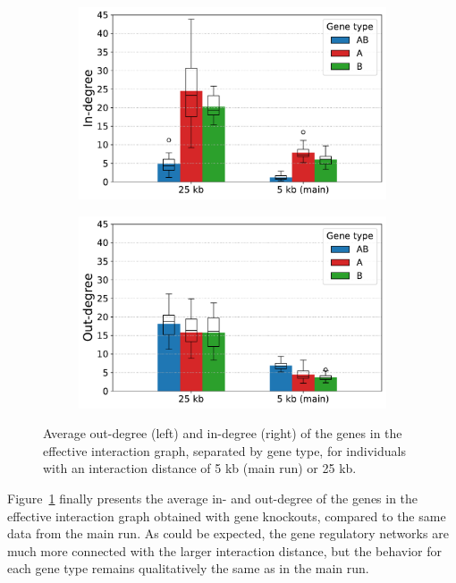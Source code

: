 \begin{figure}[H]
\centering
  \begin{subfigure}[t]{0.495\textwidth}
    \includegraphics[width=\textwidth]{param/interaction-25k/effective_graph_combined_in_degree.pdf}
  \end{subfigure}
  \begin{subfigure}[t]{0.495\textwidth}
    \includegraphics[width=\textwidth]{param/interaction-25k/effective_graph_combined_out_degree.pdf}
  \end{subfigure}
  \caption[Average in- and out-degree of effective interaction graph nodes, with an interaction distance of 25 kb]{Average out-degree (left) and in-degree (right) of the genes in the effective interaction graph, separated by gene type, for individuals with an interaction distance of 5 kb (main run) or 25 kb.}
  \label{fig:param:inter25k-degree}
\end{figure}

Figure~\ref{fig:param:inter25k-degree} finally presents the average in- and out-degree of the genes in the effective interaction graph obtained with gene knockouts, compared to the same data from the main run.
As could be expected, the gene regulatory networks are much more connected with the larger interaction distance, but the behavior for each gene type remains qualitatively the same as in the main run.

